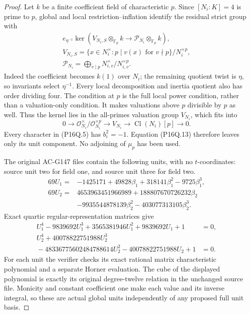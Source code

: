 \begin{proof}
Let $k$ be a finite coefficient field of characteristic $p$.
Since $[N_i:K]=4$ is prime to $p$, global and local
restriction--inflation identify the residual strict group with
\[
 \begin{gathered}
 e_{\eta^{-1}}\ker\left(V_{N_i,S}\otimes_{\mathbb F_p}k
                       \longrightarrow\mathcal P_{N_i}\otimes_{\mathbb F_p}k\right),\\
 V_{N_i,S}=\{x\in N_i^\times:p\mid v(x)\text{ for }v\nmid p\}/N_i^{\times p},\\
 \mathcal P_{N_i}=\bigoplus_{v\mid p}N_{i,v}^\times/N_{i,v}^{\times p}.
 \end{gathered}
 \tag{P16Q.14}
\]
Indeed the coefficient becomes $k(1)$ over $N_i$; the remaining
quotient twist is $\eta$, so invariants select $\eta^{-1}$.
Every local decomposition and inertia quotient also has order
dividing four.  The condition at $p$ is the full local power
condition, rather than a valuation-only condition.
It makes valuations above $p$ divisible by $p$ as well.
Thus the kernel lies in the all-primes valuation group $V_{N_i}$,
which fits into
\[
 0\longrightarrow\mathcal O_{N_i}^\times/\mathcal O_{N_i}^{\times p}
 \longrightarrow V_{N_i}\longrightarrow\operatorname{Cl}(N_i)[p]
 \longrightarrow0.
 \tag{P16Q.15}
\]
Every character in (P16Q.5) has $b_i^2=-1$.
Equation (P16Q.13) therefore leaves only its unit component.
No adjoining of $\mu_p$ has been used.

The original AC-G147 files contain the following units, with no
$t$-coordinates: source unit two for field one, and source unit
three for field two.
\[
 \begin{aligned}
 69U_1={}&-1425171+49828\beta_1+318141\beta_1^2-9725\beta_1^3,\\
 69U_2={}&4653963451966989+188807670726232\beta_2\\
        &-9935544878139\beta_2^2-403077313105\beta_2^3.
 \end{aligned}
 \tag{P16Q.16}
\]
Exact quartic regular-representation matrices give
\[
 \begin{aligned}
 U_1^4-9839692U_1^3+3565381946U_1^2+9839692U_1+1&=0,\\
 U_2^4+40078822751988U_2^3\qquad&\\
 {}-48336775602484788614U_2^2-40078822751988U_2+1&=0.
 \end{aligned}
 \tag{P16Q.17}
\]
For each unit the verifier checks its exact rational matrix
characteristic polynomial and a separate Horner evaluation.
The cube of the displayed polynomial is exactly its original
degree-twelve relation in the unchanged source file.
Monicity and constant coefficient one make each value and its
inverse integral, so these are actual global units independently
of any proposed full unit basis.


\end{proof}
